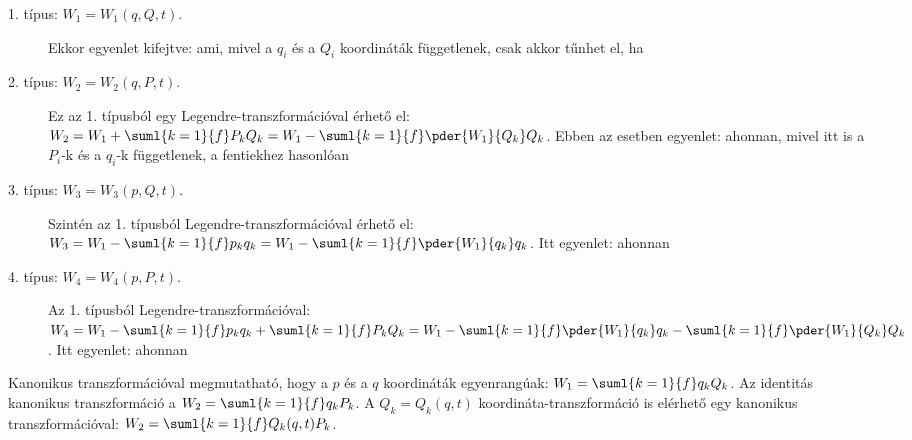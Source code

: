   \begin{description}
    \item[1. típus: $W_1=W_1(q,Q,t)$.]
     Ekkor  egyenlet kifejtve:
     ami, mivel a $q_i$ és a $Q_i$ koordináták függetlenek, csak akkor tűnhet el, ha 
    \item[2. típus: $W_2=W_2(q,P,t)$.]
     Ez az 1. típusból egy Legendre-transzformációval érhető el: $W_2=W_1+\suml{k=1}{f}P_kQ_k=W_1-\suml{k=1}{f}\pder{W_1}{Q_k}Q_k$.
   Ebben az esetben  egyenlet:
     ahonnan, mivel itt is a $P_i$-k és a $q_i$-k függetlenek, a fentiekhez hasonlóan 
    \item[3. típus: $W_3=W_3(p,Q,t)$.]
     Szintén az 1. típusból Legendre-transzformációval érhető el: $W_3=W_1-\suml{k=1}{f}p_kq_k=W_1-\suml{k=1}{f}\pder{W_1}{q_k}q_k$.
   Itt  egyenlet:
     ahonnan
    \item[4. típus: $W_4=W_4(p,P,t)$.]
     Az 1. típusból Legendre-transzformációval: $W_4=W_1-\suml{k=1}{f}p_kq_k+\suml{k=1}{f}P_kQ_k=W_1-\suml{k=1}{f}\pder{W_1}{q_k}q_k-\suml{k=1}{f}\pder{W_1}{Q_k}Q_k$.
   Itt  egyenlet:
     ahonnan
   \end{description}
   Kanonikus transzformációval megmutatható, hogy a $p$ és a $q$ koordináták egyenrangúak: $W_1=\suml{k=1}{f}q_kQ_k$.
   Az identitás kanonikus transzformáció a $W_2=\suml{k=1}{f}q_kP_k$.
   A $Q_k=Q_k(q,t)$ koordináta-transzformáció is elérhető egy kanonikus transzformációval: $W_2=\suml{k=1}{f}Q_k(q,t)P_k$. 
   
